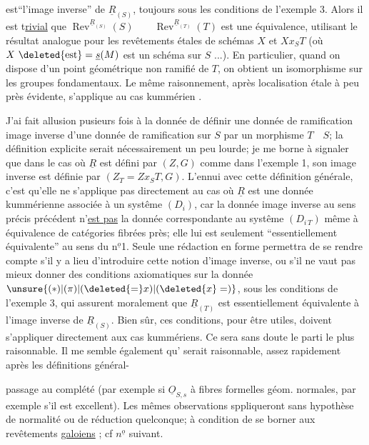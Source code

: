 
est``l'image inverse'' de $\underline{R}_{(S)}$, toujours sous les conditions de l'exemple 3. Alors il est t\uline{rivial} que $\operatorname{Rev}^{\underline{R}_{(S)}}(S)\qquad\operatorname{Rev}^{\underline{R}_{(T)}}(T)$ est une équivalence, utilisant le résultat analogue pour les revêtements étales de schémas $X$ et $Xx_{S}T$ (où $X\ \deleted{\mathrm{est}}=\underline{s}(M)$ est un schéma  sur $S$ ...). En particulier, quand on dispose d'un point géométrique non ramifié de $T$, on obtient un isomorphisme sur les groupes fondamentaux. Le même raisonnement, après localisation étale à peu près évidente, s'applique au cas kummérien .

J'ai fait allusion pusieurs fois à la donnée de définir une donnée de ramification image inverse d'une donnée de ramification sur $S$ par un morphisme $T\quad S$; la définition explicite serait nécessairement un peu lourde; je me borne à signaler que dans le cas où $\underline{R}$ est défini par $(Z,G)$ comme dans l'exemple 1, son image inverse est définie par $(Z_T=Zx_ST,G)$. L'ennui avec cette définition générale, c'est qu'elle ne s'applique pas directement au cas où $\underline{R}$ est une donnée kummérienne associée à un systême $(D_i)$, car la donnée image inverse au sens précis précédent n'\uline{est pas} la donnée correspondante au systême $(D_{i\,T})$ même à équivalence de catégories fibrées près; elle lui est seulement ``essentiellement équivalente'' au sens du n$^{\underline{o}}$1. Seule une rédaction en forme permettra de se rendre compte s'il y a lieu d'introduire cette notion d'image inverse, ou s'il ne vaut pas mieux donner des conditions axiomatiques sur la donnée $\unsure{(*)|(\pi)|(\deleted{=}x)|(\deleted{x}=)}$, sous les conditions de l'exemple 3, qui assurent moralement que $\underline{R}_{(T)}$ est essentiellement équivalente à l'image inverse de $\underline{R}_{(S)}$. Bien sûr, ces conditions, pour  être utiles, doivent s'appliquer directement aux cas kummériens. Ce sera sans doute le parti le plus raisonnable. Il me semble également qu' serait raisonnable, assez rapidement après les définitions général-


passage au complété (par exemple si $\underline{O}_{S,s}$ à fibres formelles géom. normales, par exemple s'il est excellent). Les mêmes observations sppliqueront sans hypothèse de normalité ou de réduction quelconque; à condition de se borner aux revêtements  \uline{galoiens} ; cf $n^{\underline{o}}$ suivant.

